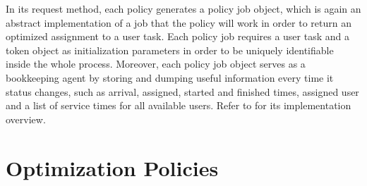 \documentclass{seal_thesis}
\begin{document}

In its request method, each policy generates a policy job object, which is again an abstract implementation of a job that the policy will work in order to return an optimized assignment to a user task. Each policy job requires a user task and a token object as initialization parameters in order to be uniquely identifiable inside the whole process. Moreover, each policy job object serves as a bookkeeping agent by storing and dumping useful information every time it status changes, such as arrival, assigned, started and finished times, assigned user and a list of service times for all available users. Refer to  for its implementation overview.


\section{Optimization Policies}
\label{sec:opt_policies}
\end{document}
